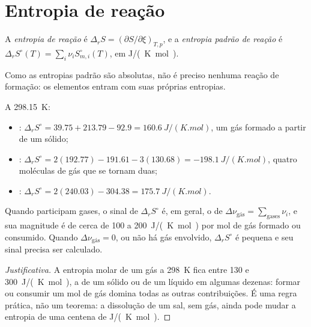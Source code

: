 \section{Entropia de reação}

\begin{definition}\label{def:b2:reaction-free-energy:reaction-entropy}
A \emph{entropia de reação} é $\Delta_r S =
(\partial S/\partial\xi)_{T,p}$, e a \emph{entropia padrão de
reação} é $\Delta_r S^\circ(T) =
\sum_i\nu_iS^\circ_{m,i}(T)$, em \unit{J/(K.mol)}.
\end{definition}

Como as entropias padrão são absolutas, não é preciso nenhuma reação de
formação: os elementos entram com suas próprias entropias.

\begin{example}\label{ex:b2:reaction-free-energy:entropies}
A \qty{298.15}{K}:
\begin{itemize}
  \item {}: $\Delta_r S^\circ = 39.75 + 213.79 -
        92.9 = \qty{+160.6}{J/(K.mol)}$, um gás formado a partir de um sólido;
  \item {}: $\Delta_r S^\circ = 2(192.77) -
        191.61 - 3(130.68) = \qty{-198.1}{J/(K.mol)}$, quatro moléculas de gás
        que se tornam duas;
  \item {}: $\Delta_r S^\circ = 2(240.03) - 304.38 =
        \qty{+175.7}{J/(K.mol)}$.
\end{itemize}
\end{example}

\begin{proposition}\label{prop:b2:reaction-free-energy:sign-rule}
Quando participam gases, o sinal de $\Delta_r S^\circ$ é, em geral, o de
$\Delta\nu_{\text{gás}} = \sum_{\text{gases}}\nu_i$, e sua magnitude é de cerca de
\qty{100}{} a \qty{200}{J/(K.mol)} por mol de gás formado ou consumido. Quando
$\Delta\nu_{\text{gás}} = 0$, ou não há gás envolvido, $\Delta_r S^\circ$ é
pequena e seu sinal precisa ser calculado.
\end{proposition}

\begin{proof}[Justificativa]
A entropia molar de um gás a \qty{298}{K} fica entre 130 e
\qty{300}{J/(K.mol)}, a de um sólido ou de um líquido em algumas dezenas:
formar ou consumir um mol de gás domina todas as outras contribuições. É
uma regra prática, não um teorema: a dissolução de um sal, sem gás, ainda
pode mudar a entropia de uma centena de \unit{J/(K.mol)}.
\end{proof}

